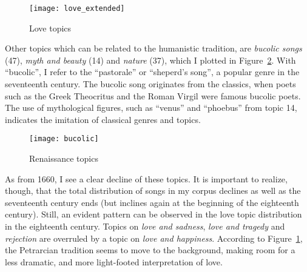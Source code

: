 \begin{figure}[hbt!]
	\centering
	\texttt{[image: love\_extended]}
	\caption{Love topics}
	\label{fig:love_extended}
\end{figure}

Other topics which can be related to the humanistic tradition, are \textit{bucolic songs} (47), \textit{myth and beauty} (14) and \textit{nature} (37), which I plotted in Figure~\ref{fig:bucolic}. With \enquote{bucolic}, I refer to the \enquote{pastorale} or \enquote{sheperd's song}, a popular genre in the seventeenth century. The bucolic song originates from the classics, when poets such as the Greek Theocritus and the Roman Virgil were famous bucolic poets. The use of mythological figures, such as \enquote{venus} and \enquote{phoebus} from topic 14, indicates the imitation of classical genres and topics.

\begin{figure}[hbt!]
	\centering
	\texttt{[image: bucolic]}
	\caption{Renaissance topics}
	\label{fig:bucolic}
\end{figure}

As from 1660, I see a clear decline of these topics. It is important to realize, though, that the total distribution of songs in my corpus declines as well as the seventeenth century ends (but inclines again at the beginning of the eighteenth century). Still, an evident pattern can be observed in the love topic distribution in the eighteenth century. Topics on \textit{love and sadness}, \textit{love and tragedy} and \textit{rejection} are overruled by a topic on \textit{love and happiness}. According to Figure~\ref{fig:love_extended}, the Petrarcian tradition seems to move to the background, making room for a less dramatic, and more light-footed interpretation of love.

